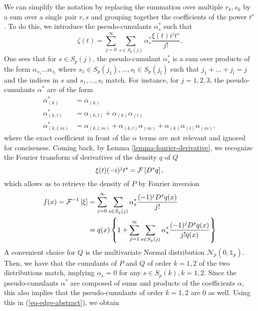 We can simplify the notation by replacing the summation over multiple $r_k, s_k$ by a sum over a single pair $r, s$ and grouping together the coefficients of the power $t^s$. To do this, we introduce the pseudo-cumulants $\alpha^*_s$ such that
\begin{equation} \label{eq-char-expansion}
    \zeta(t) = 
    \sum_{j=0}^\infty 
    \sum_{s \in S_p(j)}
    \alpha^*_s \frac{\xi(t) i^{j} t^{s}}{j!}.
\end{equation}
One sees that for $s \in S_p(j)$, the pseudo-cumulant $\alpha^*_s$ is a sum over products of the form $\alpha_{s_1}\ldots\alpha_{s_l}$ where $s_1 \in S_p(j_1), \ldots, s_l \in S_p(j_l)$ such that $j_1 + \ldots + j_l = j$ and the indices in $s$ and $s_1, \ldots, s_l$ match. For instance, for $j = 1, 2, 3$, the pseudo-cumulants $\alpha^*$ are of the form
\begin{align*}
    \alpha^*_{(k)} &= \alpha_{(k)} \\
    \alpha^*_{(k, l)} &= \alpha_{(k, l)} + \alpha_{(k)}\alpha_{(l)}\\
    \alpha^*_{(k, l, m)} &= \alpha_{(k, l, m)} + \alpha_{(k, l)}\alpha_{(m)} + \alpha_{(k)}\alpha_{(l)}\alpha_{(m)},
\end{align*}
where the exact coefficient in front of the $\alpha$ terms are not relevant and ignored for conciseness. Coming back, by Lemma \ref{lemma-fourier-derivative}, we recognize the Fourier transform of derivatives of the density $q$ of $Q$
\begin{equation*}
    \xi(t) (-i)^{j} t^s  = \mathcal{F} \left[ D^s q \right],
\end{equation*}
which allows us to retrieve the density of $P$ by Fourier inversion
\begin{align}\label{eq-edge-abstract}
    f(x) = \mathcal{F}^{-1}\left[\xi\right] &= 
    \sum_{j=0}^\infty 
    \sum_{s \in S_p(j)}
    \alpha^*_s \frac{(-1)^j D^s q(x)}{j!}\nonumber\\
    &= 
    q(x) \left\{ 1 + \sum_{j=1}^\infty 
    \sum_{s \in S_p(j)}
    \alpha^*_s \frac{(-1)^j D^s q(x)}{j! q(x)}\right\}
\end{align}
A convenient choice for $Q$ is the multivariate Normal distribution $\mathcal{N}_p(0, \mathbb{1}_p)$. Then, we have that the cumulants of $P$ and $Q$ of order $k=1,2$ of the two distributions match, implying $\alpha_s = 0$ for any $s \in S_p(k), k=1,2$. Since the pseudo-cumulants $\alpha^*$ are composed of sums and products of the coefficients $\alpha$, this also implies that the pseudo-cumulants of order $k=1,2$ are 0 as well. Using this in (\ref{eq-edge-abstract}), we obtain
